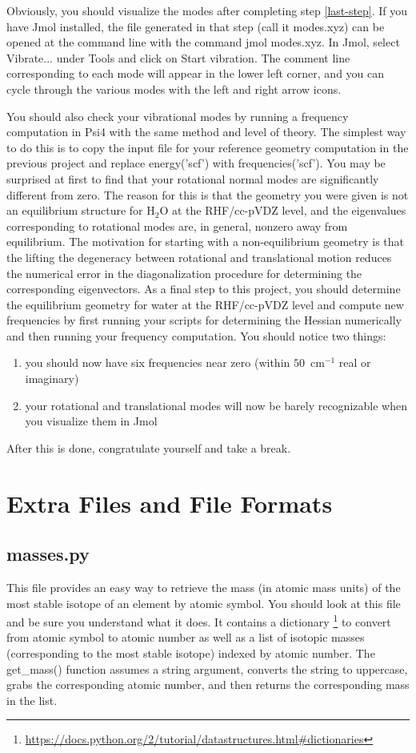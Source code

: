 \documentclass[11pt]{article}
\newcommand{\ttf}[1]{{\ttfamily #1}}
\begin{document}
Obviously, you should visualize the modes after completing step \ref{last-step}.
If you have Jmol installed, the file generated in that step (call it \ttf{modes.xyz}) can be opened at the command line with the command \ttf{jmol modes.xyz}.
In Jmol, select \ttf{Vibrate...} under \ttf{Tools} and click on \ttf{Start vibration}.
The comment line corresponding to each mode will appear in the lower left corner, and you can cycle through the various modes with the left and right arrow icons.

You should also check your vibrational modes by running a frequency computation in Psi4 with the same method and level of theory.
The simplest way to do this is to copy the input file for your reference geometry computation in the previous project and replace \ttf{energy('scf')} with \ttf{frequencies('scf')}.
You may be surprised at first to find that your rotational normal modes are significantly different from zero.
The reason for this is that the geometry you were given is not an equilibrium structure for H$_2$O at the RHF/cc-pVDZ level, and the eigenvalues corresponding to rotational modes are, in general, nonzero away from equilibrium.
The motivation for starting with a non-equilibrium geometry is that the lifting the degeneracy between rotational and translational motion reduces the numerical error in the diagonalization procedure for determining the corresponding eigenvectors.
As a final step to this project, you should determine the equilibrium geometry for water at the RHF/cc-pVDZ level and compute new frequencies by first running your scripts for determining the Hessian numerically and then running your frequency computation.
You should notice two things:
\begin{enumerate}
	\item you should now have six frequencies near zero (within $50$~cm$^{-1}$ real or imaginary)
	\item your rotational and translational modes will now be barely recognizable when you visualize them in Jmol
\end{enumerate}
After this is done, congratulate yourself and take a break.


\newpage
\section{Extra Files and File Formats}
\subsection{\ttf{masses.py}}
This file provides an easy way to retrieve the mass (in atomic mass units) of the most stable isotope of an element by atomic symbol.
You should look at this file and be sure you understand what it does.
It contains a dictionary \footnote{\url{https://docs.python.org/2/tutorial/datastructures.html\#dictionaries}} to convert from atomic symbol to atomic number as well as a list of isotopic masses (corresponding to the most stable isotope) indexed by atomic number.
The \ttf{get\_mass()} function assumes a string argument, converts the string to uppercase, grabs the corresponding atomic number, and then returns the corresponding mass in the list.
\end{document}
